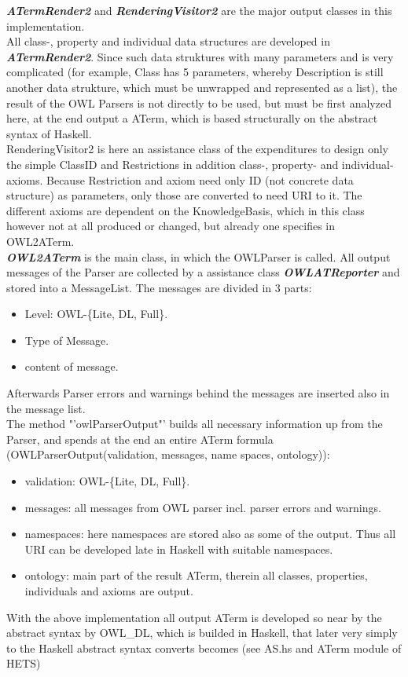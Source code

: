 \documentclass[11pt,a4paper]{article}
\begin{document}
\textbf{\emph{ATermRender2}} and \textbf{\emph{RenderingVisitor2}} are the major output classes in this implementation.\\

All class-, property and individual data structures are developed in \textbf{\emph{ATermRender2}}.  Since such data struktures with many parameters and is very complicated (for example, Class has 5 parameters, whereby Description is still another data strukture, which must be unwrapped and represented as a list), the result of the OWL Parsers is not directly to be used, but must be first analyzed here, at the end output a ATerm, which is based structurally on the abstract syntax of Haskell.\\

RenderingVisitor2 is here an assistance class of the expenditures to design only the simple ClassID and Restrictions in addition class-, property- and individual- axioms.  Because Restriction and axiom need only ID (not concrete data structure) as parameters, only those are converted to need URI to it.  The different axioms are dependent on the KnowledgeBasis, which in this class however not at all produced or changed, but already one specifies in OWL2ATerm.\\

\textbf{\emph{OWL2ATerm}} is the main class, in which the OWLParser is called.  All output messages of the Parser are collected by a assistance class \textbf{\emph{OWLATReporter}} and stored into a MessageList.  The messages are divided in 3 parts:
	\begin{itemize}
		\item Level: OWL-\{Lite, DL, Full\}.
		\item Type of Message.
		\item content of message.
	\end{itemize} 
Afterwards Parser errors and warnings behind the messages are inserted also in the message list. \\
The method "'owlParserOutput"' builds all necessary information up from the Parser, and spends at the end an entire ATerm formula (OWLParserOutput(validation, messages, name spaces, ontology)):
	\begin{itemize}
		\item validation: OWL-\{Lite, DL, Full\}.
		\item messages: all messages from OWL parser incl. parser errors and warnings.
		\item namespaces: here namespaces are stored also as some of the output.  Thus all URI can be developed late in Haskell with suitable namespaces.
		\item ontology: main part of the result ATerm, therein all classes, properties, individuals and axioms are output.
	\end{itemize} 
   With the above implementation all output ATerm is developed so near by the abstract syntax by OWL\_DL, which is builded in Haskell, that later very simply to the Haskell abstract syntax converts becomes (see AS.hs and ATerm module of HETS)\\
\end{document}
